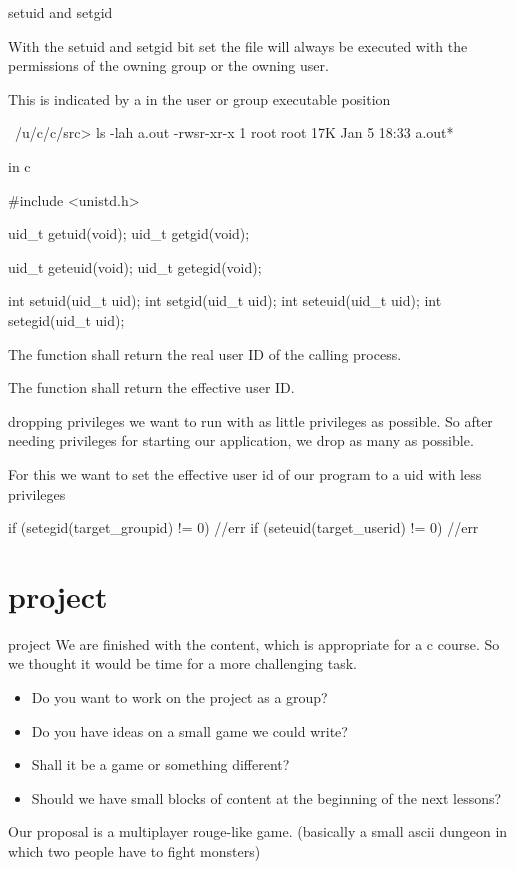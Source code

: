 \documentclass[10pt,graphics,aspectratio=169,table]{beamer}
\begin{document}
\begin{frame}[fragile]{setuid and setgid}

With the setuid and setgid bit set the file will always be executed with the permissions
of the owning group or the owning user.

This is indicated by a  in the user or group executable position

\begin{codeblock}
~/u/c/c/src> ls -lah a.out 
-rwsr-xr-x 1 root root 17K Jan  5 18:33 a.out*
\end{codeblock} 
\end{frame}
\begin{frame}[fragile]{in c}
\begin{codeblock}
#include <unistd.h>

uid_t getuid(void);
uid_t getgid(void);

uid_t geteuid(void);
uid_t getegid(void);

int setuid(uid_t uid);
int setgid(uid_t uid);
int seteuid(uid_t uid);
int setegid(uid_t uid);
\end{codeblock}

The  function shall return the real user ID  of  the  calling process.

The  function shall return the effective user ID.

\end{frame}

\begin{frame}[fragile]{dropping privileges}
we want to run with as little privileges as possible. So after needing privileges for starting our application, we drop as many as possible.

For this we want to set the effective user id of our program to a uid with less privileges

\begin{codeblock}
if (setegid(target_groupid) != 0)
    //err
if (seteuid(target_userid) != 0)
    //err
\end{codeblock}

\end{frame}

\section{project}

\begin{frame}{project}
    We are finished with the content, which is appropriate for a c course. 
So we thought it would be time for a more challenging task.
\begin{itemize}
    \item Do you want to work on the project as a group?
    \item Do you have ideas on a small game we could write?
    \item Shall it be a game or something different?
    \item Should we have small blocks of content at the beginning of the next lessons?
\end{itemize}
Our proposal is a multiplayer rouge-like game. (basically a small ascii dungeon in which two people have to fight monsters)
\end{frame}
\end{document}
